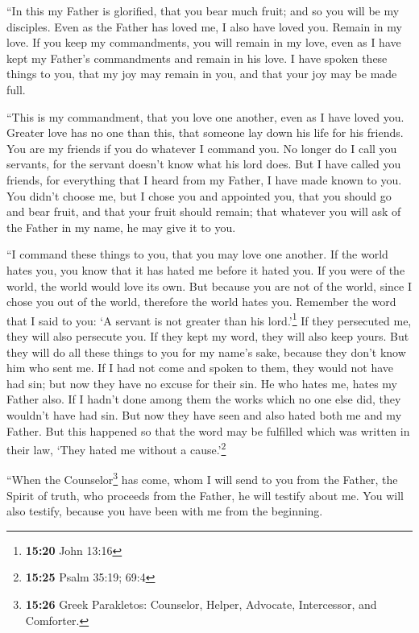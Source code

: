 \begin{paracol}{2}
\begin{otherlanguage}{english}
 ``In this my Father is glorified, that you bear much
fruit; and so you will be my disciples.  Even as the
Father has loved me, I also have loved you. Remain in my love.
 If you keep my commandments, you will remain in my love,
even as I have kept my Father's commandments and remain in his love.
 I have spoken these things to you, that my joy may
remain in you, and that your joy may be made full.

 ``This is my commandment, that you love one another,
even as I have loved you.  Greater love has no one than
this, that someone lay down his life for his friends. 
You are my friends if you do whatever I command you.  No
longer do I call you servants, for the servant doesn't know what his
lord does. But I have called you friends, for everything that I heard
from my Father, I have made known to you.  You didn't
choose me, but I chose you and appointed you, that you should go and
bear fruit, and that your fruit should remain; that whatever you will
ask of the Father in my name, he may give it to you.

 ``I command these things to you, that you may love one
another.  If the world hates you, you know that it has
hated me before it hated you.  If you were of the world,
the world would love its own. But because you are not of the world,
since I chose you out of the world, therefore the world hates you.
 Remember the word that I said to you: `A servant is not
greater than his lord.'\footnote{\textbf{15:20} John 13:16} If they
persecuted me, they will also persecute you. If they kept my word, they
will also keep yours.  But they will do all these things
to you for my name's sake, because they don't know him who sent me.
 If I had not come and spoken to them, they would not
have had sin; but now they have no excuse for their sin. 
He who hates me, hates my Father also.  If I hadn't done
among them the works which no one else did, they wouldn't have had sin.
But now they have seen and also hated both me and my Father.
 But this happened so that the word may be fulfilled
which was written in their law, `They hated me without a
cause.'\footnote{\textbf{15:25} Psalm 35:19; 69:4}

 ``When the Counselor\footnote{\textbf{15:26} Greek
  Parakletos: Counselor, Helper, Advocate, Intercessor, and Comforter.}
has come, whom I will send to you from the Father, the Spirit of truth,
who proceeds from the Father, he will testify about me. 
You will also testify, because you have been with me from the beginning.


\end{otherlanguage}
\end{paracol}

